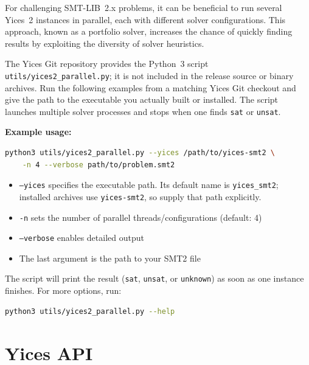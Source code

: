 \documentclass[11pt,twoside,fleqn,openright,titlepage]{cslreport}
\begin{document}
For challenging SMT-LIB~2.x problems, it can be beneficial to run several Yices~2 instances in parallel, each with different solver configurations. This approach, known as a portfolio solver, increases the chance of quickly finding results by exploiting the diversity of solver heuristics.

The Yices Git repository provides the Python~3 script
\texttt{utils/yices2\_parallel.py}; it is not included in the release source
or binary archives. Run the following examples from a matching Yices Git
checkout and give the path to the executable you actually built or installed.
The script launches multiple solver processes and stops when one finds
\texttt{sat} or \texttt{unsat}.

\medskip\noindent
\textbf{Example usage:}
\begin{small}
\begin{lstlisting}[language=sh]
python3 utils/yices2_parallel.py --yices /path/to/yices-smt2 \
    -n 4 --verbose path/to/problem.smt2
\end{lstlisting}
\end{small}

\begin{itemize}
  \item \texttt{--yices} specifies the executable path. Its default name is
    \texttt{yices\_smt2}; installed archives use \texttt{yices-smt2}, so supply
    that path explicitly.
  \item \texttt{-n} sets the number of parallel threads/configurations (default: 4)
  \item \texttt{--verbose} enables detailed output
  \item The last argument is the path to your SMT2 file
\end{itemize}

The script will print the result (\texttt{sat}, \texttt{unsat}, or \texttt{unknown}) as soon as one instance finishes. For more options, run:
\begin{small}
\begin{lstlisting}[language=sh]
python3 utils/yices2_parallel.py --help
\end{lstlisting}
\end{small}


\chapter{Yices API}
\label{yices-api}
\end{document}
